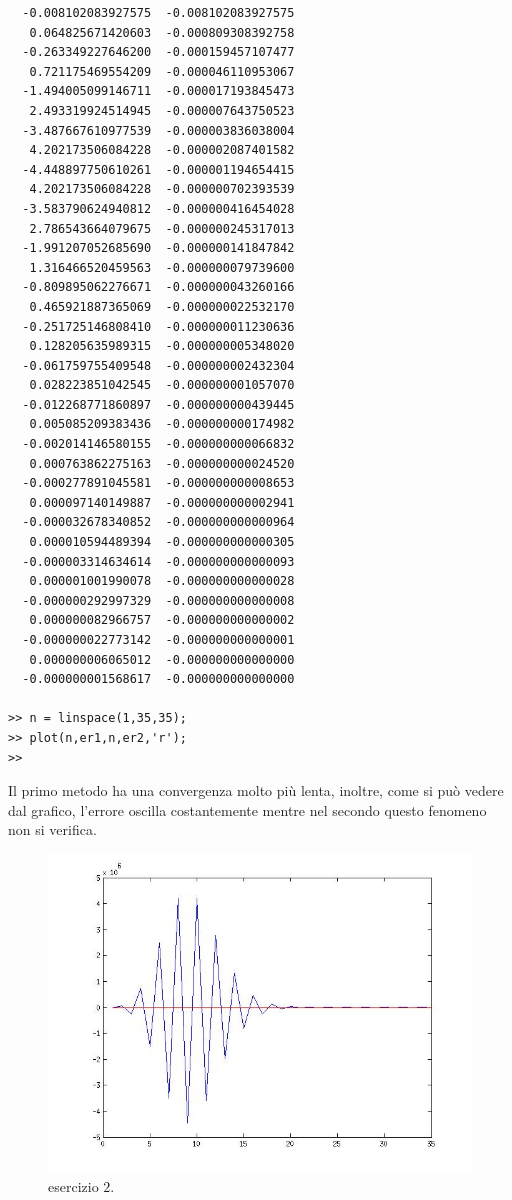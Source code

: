 \begin{enumerate}
\begin{svol}
\begin{codice}
\begin{verbatim}
  -0.008102083927575  -0.008102083927575
   0.064825671420603  -0.000809308392758
  -0.263349227646200  -0.000159457107477
   0.721175469554209  -0.000046110953067
  -1.494005099146711  -0.000017193845473
   2.493319924514945  -0.000007643750523
  -3.487667610977539  -0.000003836038004
   4.202173506084228  -0.000002087401582
  -4.448897750610261  -0.000001194654415
   4.202173506084228  -0.000000702393539
  -3.583790624940812  -0.000000416454028
   2.786543664079675  -0.000000245317013
  -1.991207052685690  -0.000000141847842
   1.316466520459563  -0.000000079739600
  -0.809895062276671  -0.000000043260166
   0.465921887365069  -0.000000022532170
  -0.251725146808410  -0.000000011230636
   0.128205635989315  -0.000000005348020
  -0.061759755409548  -0.000000002432304
   0.028223851042545  -0.000000001057070
  -0.012268771860897  -0.000000000439445
   0.005085209383436  -0.000000000174982
  -0.002014146580155  -0.000000000066832
   0.000763862275163  -0.000000000024520
  -0.000277891045581  -0.000000000008653
   0.000097140149887  -0.000000000002941
  -0.000032678340852  -0.000000000000964
   0.000010594489394  -0.000000000000305
  -0.000003314634614  -0.000000000000093
   0.000001001990078  -0.000000000000028
  -0.000000292997329  -0.000000000000008
   0.000000082966757  -0.000000000000002
  -0.000000022773142  -0.000000000000001
   0.000000006065012  -0.000000000000000
  -0.000000001568617  -0.000000000000000

>> n = linspace(1,35,35);
>> plot(n,er1,n,er2,'r');
>> 
\end{verbatim}
\end{codice}
Il primo metodo ha una convergenza molto più lenta, inoltre, come si può
vedere dal grafico, l'errore oscilla costantemente mentre nel secondo
questo fenomeno non si verifica.
\begin{figure}[!ht]\begin{center}
\includegraphics[scale=.50]{fig/es5-2.jpg}\end{center}
\caption{esercizio $2$.}
\end{figure}
\end{svol}


\end{enumerate}
